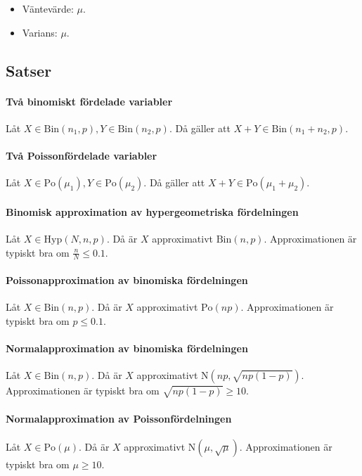 \begin{itemize}
	\item Väntevärde: $\mu$.
	\item Varians: $\mu$.
\end{itemize}

\subsection{Satser}

\paragraph{Två binomiskt fördelade variabler}
Låt $X\in\text{Bin}(n_1, p), Y\in\text{Bin}(n_2, p)$. Då gäller att $X + Y\in\text{Bin}(n_1 + n_2, p)$.

\proof

\paragraph{Två Poissonfördelade variabler}
Låt $X\in\text{Po}(\mu_1), Y\in\text{Po}(\mu_2)$. Då gäller att $X + Y\in\text{Po}(\mu_1 + \mu_2)$.

\proof

\paragraph{Binomisk approximation av hypergeometriska fördelningen}
Låt $X\in\text{Hyp}(N, n, p)$. Då är $X$ approximativt $\text{Bin}(n, p)$. Approximationen är typiskt bra om $\frac{n}{N}\leq 0.1$.

\proof

\paragraph{Poissonapproximation av binomiska fördelningen}
Låt $X\in\text{Bin}(n, p)$. Då är $X$ approximativt $\text{Po}(np)$. Approximationen är typiskt bra om $p\leq 0.1$.

\proof

\paragraph{Normalapproximation av binomiska fördelningen}
Låt $X\in\text{Bin}(n, p)$. Då är $X$ approximativt $\text{N}(np, \sqrt{np(1 - p)})$. Approximationen är typiskt bra om $\sqrt{np(1 - p)}\geq 10$.

\proof

\paragraph{Normalapproximation av Poissonfördelningen}
Låt $X\in\text{Po}(\mu)$. Då är $X$ approximativt $\text{N}(\mu, \sqrt{\mu})$. Approximationen är typiskt bra om $\mu\geq 10$.

\proof